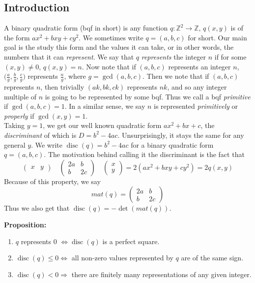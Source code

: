 \documentclass[a4paper,11pt,abstracton]{scrartcl}
\theoremstyle{dotlessP}
\theoremstyle{dotlessS}
\theoremstyle{remark}
\theoremstyle{definition}
\begin{document}
\subsection{Introduction}
A binary quadratic form (bqf in short) is any function $q:\mathbb{Z}^2\rightarrow\mathbb{Z}$, $q(x,y)$ is of the form $ax^2+bxy+cy^2$. We sometimes write $q=(a,b,c)$ for short. Our main goal is the study this form and the values it can take, or in other words, the numbers that it can \emph{represent}. We say that $q$ \emph{represents} the integer $n$ if for some $(x,y) \neq 0$, $q(x,y)=n$. Now note that if $(a,b,c)$ represents an integer $n$, $\bigg(\frac{a}{g},\frac{b}{g},\frac{c}{g}\bigg)$ represents $\frac{n}{g}$, where $g=\gcd(a,b,c)$. Then we note that if $(a,b,c)$ represents $n$, then trivially $(ak,bk,ck)$ represents $nk$, and so any integer multiple of $n$ is going to be represented by some bqf. Thus we call a bqf \emph{primitive} if $\gcd(a,b,c)=1$. In a similar sense, we say $n$ is represented \emph{primitively} or \emph{properly} if $\gcd(x,y)=1$.
\\ Taking $y=1$, we get our well known quadratic form $ax^2+bx+c$, the \emph{discriminant} of which is $D=b^2-4ac$. Unsurprisingly, it stays the same for any general $y$. We write $\operatorname{disc}(q)=b^2-4ac$ for a binary quadratic form $q=(a,b,c)$.  The motivation behind calling it the discriminant is the fact that 
\[
\begin{pmatrix}
x &y
\end{pmatrix}
\quad
\begin{pmatrix}
2a &b \\
b &2c
\end{pmatrix}
\quad
\begin{pmatrix}
x \\ y
\end{pmatrix}
= 2(ax^2+bxy+cy^2) = 2q(x,y)
\]
Because of this property, we say
\[
mat(q) =
\begin{pmatrix}
2a &b \\
b &2c
\end{pmatrix}
\]
Thus we also get that $\operatorname{disc}(q)=-\det(mat(q))$.

\begin{problem_box}
\textbf{Proposition:}
\begin{enumerate}
\item $q$ represents 0 $\iff \operatorname{disc}(q)$ is a perfect square.
\item $\operatorname{disc}(q) \leq 0 \iff$ all non-zero values represented by $q$ are of the same sign. 
\item $\operatorname{disc}(q) < 0 \Rightarrow$ there are finitely many representations of any given integer. 
\end{enumerate}
\end{problem_box}
\end{document}
